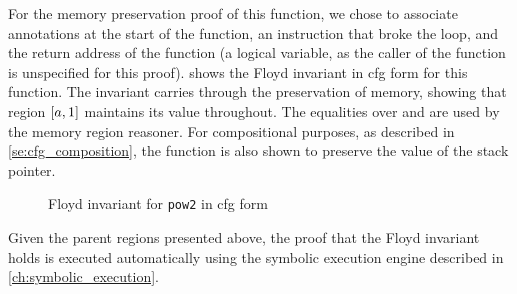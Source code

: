 For the memory preservation proof of this function, we chose to associate annotations
at the start of the function, an instruction that broke the loop,
and the return address of the function
(a logical variable, as the caller of the function is unspecified for this proof).
 shows the Floyd invariant in \ac{cfg} form for this function.
The invariant carries through the preservation of memory,
showing that region $[a,1]$ maintains its value throughout.
The equalities over  and 
are used by the memory region reasoner.
For compositional purposes, as described in \cref{se:cfg_composition},
the function is also shown to preserve the value of the stack pointer.
\begin{figure}
  \centering
  \caption{Floyd invariant for \texttt{pow2} in \acs*{cfg} form}\label{fig:pow2cfg}
\end{figure}
Given the parent regions presented above, the proof that the Floyd invariant holds
is executed automatically using the symbolic execution engine
described in \cref{ch:symbolic_execution}.

